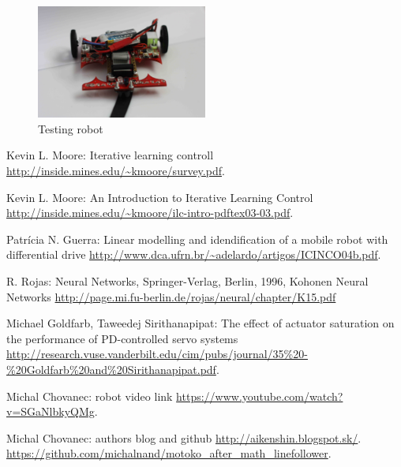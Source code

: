 \documentclass[twoside]{oss-conf-eng}
\begin{document}
\begin{figure}[]
    \centering
    \includegraphics[width=0.5\textwidth]{motoko_aftermath_front.jpg}
    \caption{Testing robot}
    \label{fig:robot}
\end{figure}


\begin{thebibliography}{99}

Kevin L. Moore: Iterative learning controll
\url{http://inside.mines.edu/~kmoore/survey.pdf}.

Kevin L. Moore: An Introduction to Iterative Learning Control
\url{http://inside.mines.edu/~kmoore/ilc-intro-pdftex03-03.pdf}.

Patrícia N. Guerra: Linear modelling and idendification of a mobile robot with
differential drive
\url{http://www.dca.ufrn.br/~adelardo/artigos/ICINCO04b.pdf}.

R. Rojas: Neural Networks, Springer-Verlag, Berlin, 1996, Kohonen Neural Networks
\url{http://page.mi.fu-berlin.de/rojas/neural/chapter/K15.pdf}

Michael Goldfarb, Taweedej Sirithanapipat:
The effect of actuator saturation on the performance of PD-controlled servo systems
\url{http://research.vuse.vanderbilt.edu/cim/pubs/journal/35%20-%20Goldfarb%20and%20Sirithanapipat.pdf}.

Michal Chovanec: robot video link
\url{https://www.youtube.com/watch?v=SGaNlbkyQMg}.

Michal Chovanec: authors blog and github
\url{http://aikenshin.blogspot.sk/}.
\url{https://github.com/michalnand/motoko_after_math_linefollower}.

\end{thebibliography}
\end{document}
